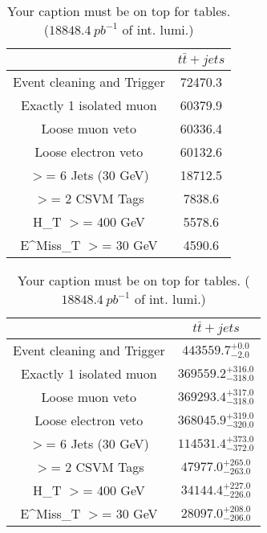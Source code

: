 \documentclass{article}
\begin{document}
\begin{table}
\caption{Your caption must be on top for tables. ($18848.4~pb^{-1}$ of int. lumi.)}
\label{tab:}
\centering
\begin{tabular}{|c|c|}
\toprule
&$t\bar{t}+jets$	\\

\midrule
Event cleaning and Trigger&	72470.3	\\

Exactly 1 isolated muon&	60379.9	\\

Loose muon veto&	60336.4	\\

Loose electron veto&	60132.6	\\

$>$= 6 Jets (30 GeV)&	18712.5	\\

$>$= 2 CSVM Tags&	7838.6	\\

H_{T} $>$=  400 GeV&	5578.6	\\

E^{Miss}_{T} $>$=  30 GeV&	4590.6	\\

\bottomrule
\end{tabular}
\end{table}
\begin{table}
\caption{Your caption must be on top for tables. ($18848.4~pb^{-1}$ of int. lumi.)}
\label{tab:}
\centering
\begin{tabular}{|c|c|}
\toprule
&$t\bar{t}+jets$	\\

\midrule
Event cleaning and Trigger&	$443559.7^{+0.0}_{-2.0}$	\\

Exactly 1 isolated muon&	$369559.2^{+316.0}_{-318.0}$	\\

Loose muon veto&	$369293.4^{+317.0}_{-318.0}$	\\

Loose electron veto&	$368045.9^{+319.0}_{-320.0}$	\\

$>$= 6 Jets (30 GeV)&	$114531.4^{+373.0}_{-372.0}$	\\

$>$= 2 CSVM Tags&	$47977.0^{+265.0}_{-263.0}$	\\

H_{T} $>$=  400 GeV&	$34144.4^{+227.0}_{-226.0}$	\\

E^{Miss}_{T} $>$=  30 GeV&	$28097.0^{+208.0}_{-206.0}$	\\

\bottomrule
\end{tabular}
\end{table}
\end{document}
